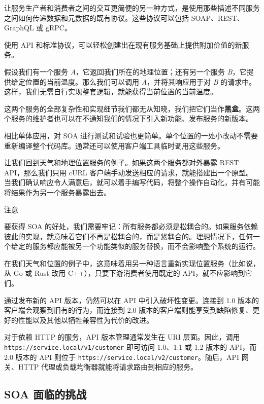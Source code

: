 让服务生产者和消费者之间的交互更简便的另一种方式，是使用那些描述不同服务之间如何传递数据和元数据的既有协议。这些协议可以包括 SOAP、REST、GraphQL 或 gRPC。

使用 API 和标准协议，可以轻松创建出在现有服务基础上提供附加价值的新服务。

假设我们有一个服务 \emph{A}，它返回我们所在的地理位置；还有另一个服务 \emph{B}，它提供给定位置的当前温度。那么我们可以调用 \emph{A}，并将其响应用于对 \emph{B} 的请求中。这样，我们无需自行实现整套逻辑，就能获得当前位置的当前温度。

\label{idx:1381}
这两个服务的全部复杂性和实现细节我们都无从知晓，我们把它们当作\textbf{黑盒}。这两个服务的维护者也可以在不通知我们的情况下引入新功能、发布服务的新版本。

相比单体应用，对 SOA 进行测试和试验也更简单。单个位置的一处小改动不需要重新编译整个代码库。通常还可以使用客户端工具临时调用这些服务。

让我们回到天气和地理位置服务的例子。如果这两个服务都对外暴露 REST API，那么我们只用 cURL 客户端手动发送相应的请求，就能搭建出一个原型。当我们确认响应令人满意后，就可以着手编写代码，将整个操作自动化，并有可能将结果作为另一个服务暴露出去。

\begin{myNotic}{注意}

要获得 SOA 的好处，我们需要牢记：所有服务都必须是松耦合的。如果服务依赖彼此的实现，就意味着它们不再是松耦合的，而是紧耦合的。理想情况下，任何一个给定的服务都应能被另一个功能类似的服务替换，而不会影响整个系统的运行。
\end{myNotic}

\label{idx:1382}
在我们天气和位置的例子中，这意味着用另一种语言重新实现位置服务（比如说，从 Go 或 Rust 改用 C++），只要下游消费者使用既定的 API，就不应影响到它们。

通过发布新的 API 版本，仍然可以在 API 中引入破坏性变更。连接到 1.0 版本的客户端会观察到旧有的行为，而连接到 2.0 版本的客户端则能享受到缺陷修复、更好的性能以及其他以牺牲兼容性为代价的改进。

对于依赖 HTTP 的服务，API 版本管理通常发生在 URI 层面。因此，调用 \texttt{https:/\allowbreak{}/\allowbreak{}service.\allowbreak{}local/\allowbreak{}v1/\allowbreak{}customer} 即可访问 1.0、1.1 或 1.2 版本的 API，而 2.0 版本的 API 则位于 \texttt{https:/\allowbreak{}/\allowbreak{}service.\allowbreak{}local/\allowbreak{}v2/\allowbreak{}customer}。随后，API 网关、HTTP 代理或负载均衡器就能将请求路由到相应的服务。

\subsection{SOA 面临的挑战}

